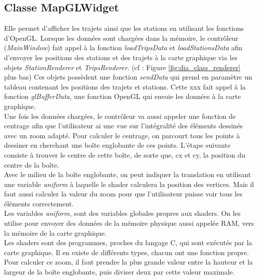 \documentclass[12pt]{article}
\begin{document}
		\subsection{Classe MapGLWidget}
		Elle permet d’afficher les trajets ainsi que les stations en utilisant les fonctions d’OpenGL. Lorsque les données sont chargées dans la mémoire, le contrôleur (\textit{MainWindow}) fait appel à la fonction \textit{loadTripsData} et \textit{loadStationsData} afin d’envoyer les positions des stations et des trajets à la carte graphique via les objets \textit{StationRenderer} et \textit{TripsRenderer}. (cf : Figure \ref{fig:dia_class_renderer} plus bas) Ces objets possèdent une fonction \textit{sendData} qui prend en paramètre
		un tableau contenant les positions des trajets et stations. Cette xxx fait appel à la fonction
		\textit{glBufferData}, une fonction OpenGL qui envoie les données à la carte graphique.\\

		Une fois les données chargées, le contrôleur va aussi appeler une fonction de centrage afin que l’utilisateur ai une vue sur l’intégralité des éléments dessinés avec un zoom adapté.
Pour calculer le centrage, on parcourt tous les points à dessiner en cherchant une boîte englobante de ces points. L’étape suivante consiste à trouver le centre de cette boîte, de sorte que, cx et cy, la position du centre de la boîte.\\

	Avec le milieu de la boîte englobante, on peut indiquer la translation en utilisant une variable
	\textit{uniform} à laquelle le shader calculera la position des vertices. Mais il faut aussi calculer la valeur du zoom pour que l’utilisateur puisse voir tous les éléments correctement.\\
	
	Les variables \textit{uniform}, sont des variables globales propres aux shaders. On les utilise
	pour envoyer des données de la mémoire physique aussi appelée RAM, vers la mémoire de la carte
	graphique.\\
	
	Les shaders sont des programmes, proches du langage C, qui sont exécutés par la carte graphique. Il
	en existe de différents types, chacun ont une fonction propre.\\

	Pour calculer ce zoom, il faut prendre la plus grande valeur entre la hauteur et la largeur de la boîte englobante, puis diviser deux par cette valeur maximale.\\
\end{document}
